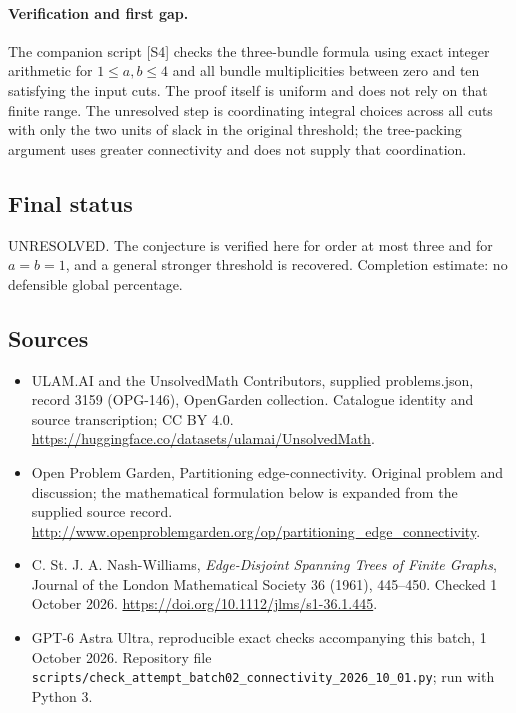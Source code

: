 \documentclass[11pt,a4paper]{article}
\begin{document}
\paragraph{Verification and first gap.}
The companion script [S4] checks the three-bundle formula using exact
integer arithmetic for $1\le a,b\le4$ and all bundle multiplicities
between zero and ten satisfying the input cuts. The proof itself is
uniform and does not rely on that finite range. The unresolved step
is coordinating integral choices across all cuts with only the two
units of slack in the original threshold; the tree-packing argument
uses greater connectivity and does not supply that coordination.

\subsection{Final status}
UNRESOLVED. The conjecture is verified here for order at most three
and for $a=b=1$, and a general stronger threshold is recovered.
Completion estimate: no defensible global percentage.

\subsection{Sources}
\begin{itemize}
\item[S1] ULAM.AI and the UnsolvedMath Contributors, supplied problems.json, record 3159 (OPG-146), OpenGarden collection. Catalogue identity and source transcription; CC BY 4.0.
\url{https://huggingface.co/datasets/ulamai/UnsolvedMath}.
\item[S2] Open Problem Garden, Partitioning edge-connectivity. Original problem and discussion; the mathematical formulation below is expanded from the supplied source record.
\url{http://www.openproblemgarden.org/op/partitioning_edge_connectivity}.
\item[S3] C. St. J. A. Nash-Williams, \emph{Edge-Disjoint Spanning Trees of Finite Graphs}, Journal of the London Mathematical Society 36 (1961), 445--450. Checked 1 October 2026.
\url{https://doi.org/10.1112/jlms/s1-36.1.445}.
\item[S4] GPT-6 Astra Ultra, reproducible exact checks accompanying this batch, 1 October 2026. Repository file \texttt{scripts/check\_attempt\_batch02\_connectivity\_2026\_10\_01.py}; run with Python 3.
\end{itemize}
\end{document}
